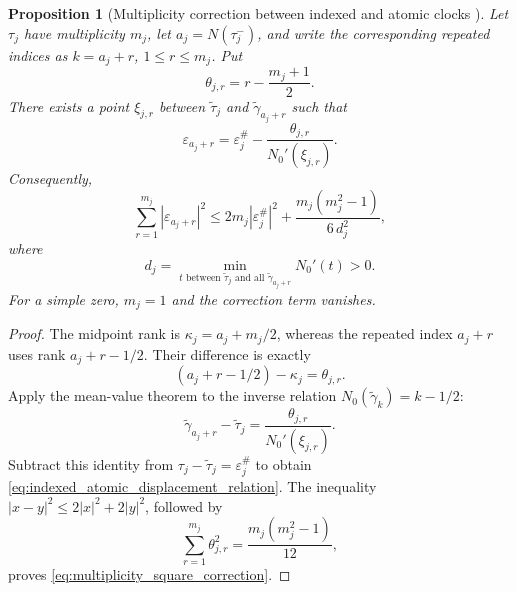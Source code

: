 \documentclass[11pt]{amsart}
\numberwithin{equation}{section}
\theoremstyle{plain}
\newtheorem{proposition}[theorem]{Proposition}
\theoremstyle{definition}
\theoremstyle{remark}
\newcommand{\1}{\mathbf{1}}
\begin{document}
\begin{proposition}[Multiplicity correction between indexed and atomic clocks {}]
\label{prop:multiplicity_clock_correction}
Let \(\tau_j\) have multiplicity \(m_j\), let
\(a_j=N(\tau_j^-)\), and write the corresponding repeated indices as
\(k=a_j+r\), \(1\leq r\leq m_j\).  Put
\begin{equation}
\theta_{j,r}=r-\frac{m_j+1}{2}.
\label{eq:multiplicity_centered_rank}
\end{equation}
There exists a point \(\xi_{j,r}\) between
\(\widetilde\tau_j\) and \(\widetilde\gamma_{a_j+r}\) such that
\begin{equation}
\boxed{
\varepsilon_{a_j+r}
=
\varepsilon_j^{\#}
-
\frac{\theta_{j,r}}{N_0'(\xi_{j,r})}.
}
\label{eq:indexed_atomic_displacement_relation}
\end{equation}
Consequently,
\begin{equation}
\sum_{r=1}^{m_j}|\varepsilon_{a_j+r}|^2
\leq
2m_j|\varepsilon_j^{\#}|^2
+
\frac{m_j(m_j^2-1)}{6\,d_j^2},
\label{eq:multiplicity_square_correction}
\end{equation}
where
\begin{equation}
d_j=
\min_{t\text{ between }\widetilde\tau_j
\text{ and all }\widetilde\gamma_{a_j+r}}N_0'(t)>0.
\label{eq:multiplicity_min_derivative}
\end{equation}
For a simple zero, \(m_j=1\) and the correction term vanishes.
\end{proposition}

\begin{proof}
The midpoint rank is
\(\kappa_j=a_j+m_j/2\), whereas the repeated index \(a_j+r\)
uses rank \(a_j+r-1/2\).  Their difference is exactly
\begin{equation}
(a_j+r-1/2)-\kappa_j=\theta_{j,r}.
\label{eq:rank_difference_exact}
\end{equation}
Apply the mean-value theorem to the inverse relation
\(N_0(\widetilde\gamma_k)=k-1/2\):
\begin{equation}
\widetilde\gamma_{a_j+r}-\widetilde\tau_j
=
\frac{\theta_{j,r}}{N_0'(\xi_{j,r})}.
\label{eq:smooth_clock_rank_mvt}
\end{equation}
Subtract this identity from
\(\tau_j-\widetilde\tau_j=\varepsilon_j^{\#}\) to obtain
\eqref{eq:indexed_atomic_displacement_relation}.  The inequality
\(|x-y|^2\leq2|x|^2+2|y|^2\), followed by
\begin{equation}
\sum_{r=1}^{m_j}\theta_{j,r}^2
=
\frac{m_j(m_j^2-1)}{12},
\label{eq:centered_rank_square_sum}
\end{equation}
proves \eqref{eq:multiplicity_square_correction}.
\end{proof}
\end{document}
